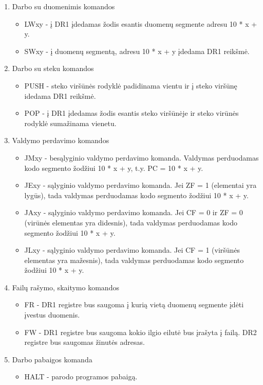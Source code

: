 \begin{enumerate}
\begin{itemize}
		\end{itemize}
	\item Darbo su duomenimis komandos
		\begin{itemize}
		\item LWxy - į DR1 įdedamas žodis esantis duomenų segmente adresu 10 * x + y.
		\item SWxy - į duomenų segmentą, adresu 10 * x + y įdedama DR1 reikšmė.
		\end{itemize}
	\item Darbo su steku komandos
		\begin{itemize}
		\item PUSH - steko viršūnės rodyklė padidinama vientu ir į steko viršūnę idedama DR1 reikšmė.
		\item POP - į DR1 įdedamas žodis esantis steko viršūnėje ir steko virūnės rodyklė sumažinama vienetu.
		\end{itemize}
	\item Valdymo perdavimo komandos
		\begin{itemize}
		\item JMxy - besąlyginio valdymo perdavimo komanda. Valdymas perduodamas kodo segmento žodžiui 10 * x + y, t.y. PC = 10 * x + y.
		\item JExy - sąlyginio valdymo perdavimo komanda. Jei ZF = 1 (elementai yra lygūs), tada valdymas perduodamas kodo segmento žodžiui 10 * x + y.
		\item JAxy - sąlyginio valdymo perdavimo komanda. Jei CF = 0 ir ZF = 0 (virūnės elementas yra didesnis), tada valdymas perduodamas kodo segmento žodžiui 10 * x + y.
		\item JLxy  - sąlyginio valdymo perdavimo komanda. Jei CF = 1 (viršūnės elementas yra mažesnis), tada valdymas perduodamas kodo segmento žodžiui 10 * x + y.
		\end{itemize}
	\item Failų rašymo, skaitymo komandos
		\begin{itemize}
		\item FR - DR1 registre bus saugoma į kurią vietą duomenų segmente įdėti įvestus duomenis.
		\item FW - DR1 registre bus saugoma kokio ilgio eilutė bus įrašyta į failą. DR2 registre bus saugomas žinutės adresas.
		\end{itemize}
	\item Darbo pabaigos komanda
		\begin{itemize}
		\item HALT - parodo programos pabaigą.
		\end{itemize}
	\end{enumerate}